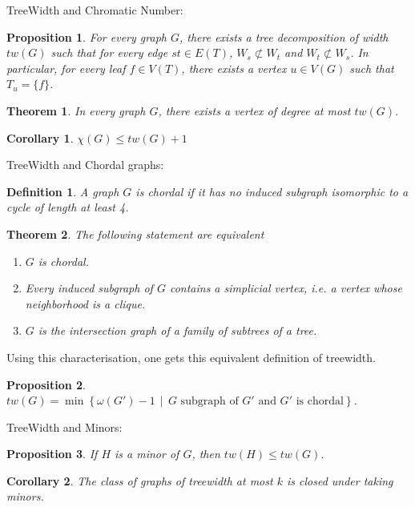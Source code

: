 \documentclass[12pt,a4paper]{article}
\newtheorem{theorem}{Theorem}
\newtheorem{prop}{Proposition}
\newtheorem{corollary}{Corollary}
\newtheorem{definition}{Definition}
\begin{document}
TreeWidth and Chromatic Number:

\begin{prop}
  For every graph $G$, there exists a tree decomposition of width $tw( G )$ such
  that for every edge $st \in E ( T )$, $W_s \not\subset W_t$ and
  $W_t \not\subset W_s$. In particular, for every leaf $f \in V ( T )$, there
  exists a vertex $u \in V ( G )$ such that $T_u = \{ f \}$.
\end{prop}

\begin{theorem}
  In every graph $G$, there exists a vertex of degree at most $tw( G )$.
\end{theorem}

\begin{corollary}
  $\chi( G ) \leq tw( G ) + 1$
\end{corollary}

TreeWidth and Chordal graphs:
\begin{definition}
  A graph $G$ is chordal if it has no induced subgraph isomorphic to a cycle of
  length at least 4.
\end{definition}

\begin{theorem}
  The following statement are equivalent
  \begin{enumerate}
  \item $G$ is chordal.
  \item Every induced subgraph of $G$ contains a simplicial vertex, i.e. a
    vertex whose neighborhood is a clique.
  \item $G$ is the intersection graph of a family of subtrees of a tree.
  \end{enumerate}
\end{theorem}

Using this characterisation, one gets this equivalent definition of treewidth.

\begin{prop}
  $tw( G ) = \min\left\{\omega( G' ) − 1 \,\middle|\, G \text{ subgraph of } G'
    \text{ and } G' \text{ is chordal}\right\}$.
\end{prop}

TreeWidth and Minors:
\begin{prop}
  If $H$ is a minor of $G$, then $tw( H ) \leq tw( G )$.
\end{prop}

\begin{corollary}
  The class of graphs of treewidth at most $k$ is closed under taking minors.
\end{corollary}
\end{document}
